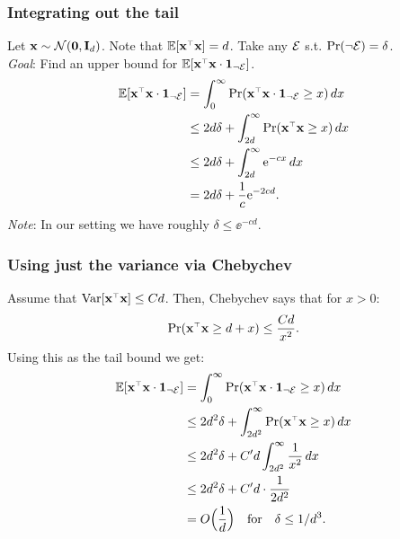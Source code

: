 \documentclass[10pt]{beamer}
\begin{document}
  \begin{frame}
    \frametitle{Integrating out the tail}
    Let $\mathbf x\sim\mathcal{N}(\mathbf 0,\mathbf I_d)$. Note that $\E[\x^\top\x]=d$. Take any
    $\mathcal E$ s.t. $\mathrm{Pr}(\neg \mathcal E)=\delta$.\\
    \emph{Goal}:
    Find an upper bound for $\E[\x^\top\x\cdot \one_{\neg \Ec}]$.
    \begin{align*}
      \E[\x^\top\x\cdot \one_{\neg \Ec}]
      &= \int_{0}^\infty\Pr(\x^\top\x\cdot \one_{\neg \Ec}\geq x)\,dx
      \\
      &\leq 2d\delta + \int_{2d}^\infty\Pr(\x^\top\x\geq x)\,dx
      \\
      &\leq 2d\delta + \int_{2d}^\infty\ee^{-cx}\,dx
      \\
      &=2d\delta + \frac1c\ee^{-2cd}.
    \end{align*}
\emph{Note}: In our setting we have roughly $\delta \leq \ee^{-cd}$.
\end{frame}

\begin{frame}
  \frametitle{Using just the variance via Chebychev}
  Assume that $\Var[\x^\top\x]\leq Cd$. Then, Chebychev says that for $x>0$:
  \begin{align*}
    \Pr(\x^\top\x\geq d+x)\leq\frac {Cd}{x^2}.
  \end{align*}
  Using this as the tail bound we get:
    \begin{align*}
      \E[\x^\top\x\cdot \one_{\neg \Ec}]
      &= \int_{0}^\infty\Pr(\x^\top\x\cdot \one_{\neg \Ec}\geq x)\,dx
      \\
      &\leq 2d^2\delta + \int_{2d^2}^\infty\Pr(\x^\top\x\geq x)\,dx
      \\
      &\leq 2d^2\delta +C'd\int_{2d^2}^\infty\frac{1}{x^2}\,dx
      \\
      &\leq 2d^2\delta + C'd\cdot \frac1{2d^2}
      \\
      &=O\Big(\frac1d\Big)\quad\text{for}\quad\delta\leq 1/d^3.
  \end{align*}
\end{frame}
\end{document}
